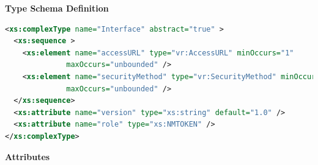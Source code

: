 \documentclass[11pt,a4paper]{ivoa}
\begin{document}

\vspace{1ex}\noindent\textbf{ Type Schema Definition}

\begin{lstlisting}[language=XML,basicstyle=\footnotesize]
<xs:complexType name="Interface" abstract="true" >
  <xs:sequence >
    <xs:element name="accessURL" type="vr:AccessURL" minOccurs="1"
              maxOccurs="unbounded" />
    <xs:element name="securityMethod" type="vr:SecurityMethod" minOccurs="0"
              maxOccurs="unbounded" />
  </xs:sequence>
  <xs:attribute name="version" type="xs:string" default="1.0" />
  <xs:attribute name="role" type="xs:NMTOKEN" />
</xs:complexType>
\end{lstlisting}

\vspace{0.5ex}\noindent\textbf{ Attributes}
\end{document}
